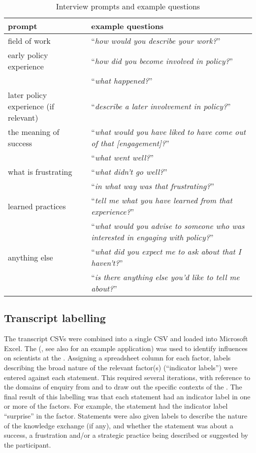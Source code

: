 \begin{table}
    \footnotesize
    \caption{Interview prompts and example questions}\label{tab:metinterview}
    \begin{tabular}{L{.4\linewidth}L{.6\linewidth}} 
    \textbf{prompt} & \textbf{example questions} \\ \hline
    field of work & ``\textit{how would you describe your work?}'' \rule[-2ex]{0pt}{6ex}\\
    early policy experience & ``\textit{how did you become involved in policy?}'' \\
     & ``\textit{what happened?}'' \\[2ex]
    later policy experience (if relevant) & ``\textit{describe a later involvement in policy?}'' \\
    the meaning of success & ``\textit{what would you have liked to have come out of that [engagement]?}''\\
     & ``\textit{what went well?}'' \\[2ex]
    what is frustrating & ``\textit{what didn't go well?}'' \\
     & ``\textit{in what way was that frustrating?}''\\[2ex]
    learned practices  & ``\textit{tell me what you have learned from that experience?}'' \\
     & ``\textit{what would you advise to someone who was interested in engaging with policy?}''\\[2ex]
    anything else & ``\textit{what did you expect me to ask about that I haven't?}'' \\
     & ``\textit{is there anything else you'd like to tell me about?}'' \\[2ex] \hline
    \end{tabular}
\end{table}

\subsection{Transcript labelling}\label{sec:metlabelling}

The transcript CSVs were combined into a single CSV and loaded into Microsoft Excel. The \ISM{} (\cite{DarntonH2013}, see also \cite{MinamitaniDOI2024} for an example application) was used to identify influences on scientists at the \SPI. Assigning a spreadsheet column for each \ISM{} factor, labels describing the broad nature of the relevant factor(s) (``indicator labels'') were entered against each statement. This required several iterations, with reference to the domains of enquiry from \textcite{BuseMW2012} and \textcite{HaynesDCRHGS2011} to draw out the specific contexts of the \SPI. The final result of this labelling was that each statement had an indicator label in one or more of the \ISM{} factors. For example, the statement  had the indicator label ``surprise'' in the \ismie{} factor. Statements were also given labels to describe the nature of the knowledge exchange (if any), and whether the statement was about a success, a frustration and/or a strategic practice being described or suggested by the participant.

